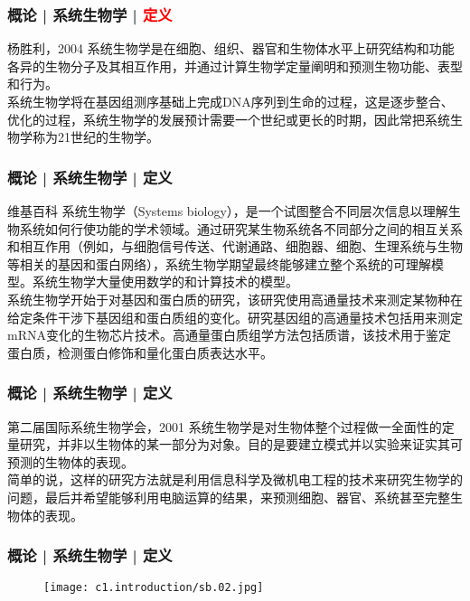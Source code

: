 \begin{frame}
  \frametitle{概论 | 系统生物学 | \textcolor{red}{定义}}
  \begin{block}{杨胜利，2004}
系统生物学是在细胞、组织、器官和生物体水平上研究结构和功能各异的生物分子及其相互作用，并通过计算生物学定量阐明和预测生物功能、表型和行为。\\
\vspace{1em}
系统生物学将在基因组测序基础上完成DNA序列到生命的过程，这是逐步整合、优化的过程，系统生物学的发展预计需要一个世纪或更长的时期，因此常把系统生物学称为21世纪的生物学。
  \end{block}
\end{frame}

\begin{frame}
  \frametitle{概论 | 系统生物学 | 定义}
  \begin{block}{维基百科}
系统生物学（Systems biology），是一个试图整合不同层次信息以理解生物系统如何行使功能的学术领域。通过研究某生物系统各不同部分之间的相互关系和相互作用（例如，与细胞信号传送、代谢通路、细胞器、细胞、生理系统与生物等相关的基因和蛋白网络），系统生物学期望最终能够建立整个系统的可理解模型。系统生物学大量使用数学的和计算技术的模型。\\
\vspace{1em}
系统生物学开始于对基因和蛋白质的研究，该研究使用高通量技术来测定某物种在给定条件干涉下基因组和蛋白质组的变化。研究基因组的高通量技术包括用来测定mRNA变化的生物芯片技术。高通量蛋白质组学方法包括质谱，该技术用于鉴定蛋白质，检测蛋白修饰和量化蛋白质表达水平。
  \end{block}
\end{frame}

\begin{frame}
  \frametitle{概论 | 系统生物学 | 定义}
  \begin{block}{第二届国际系统生物学会，2001}
系统生物学是对生物体整个过程做一全面性的定量研究，并非以生物体的某一部分为对象。目的是要建立模式并以实验来证实其可预测的生物体的表现。\\
\vspace{1em}
简单的说，这样的研究方法就是利用信息科学及微机电工程的技术来研究生物学的问题，最后并希望能够利用电脑运算的结果，来预测细胞、器官、系统甚至完整生物体的表现。
  \end{block}
\end{frame}

\begin{frame}
  \frametitle{概论 | 系统生物学 | 定义}
  \begin{figure}
    \centering
    \texttt{[image: c1.introduction/sb.02.jpg]}
  \end{figure}
\end{frame}

